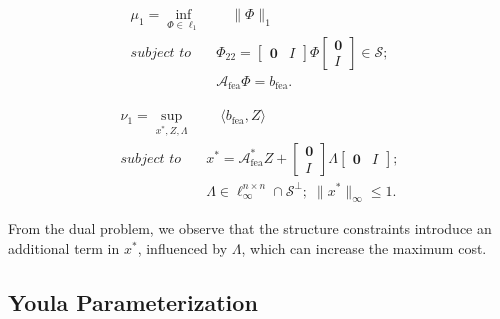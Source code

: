 \begin{opt}\label{Prob::l1min_primal}
\begin{subequations}
\begin{align}
\mu_1 = \underset{\Phi\in\ell_1}{\inf}&\quad  \|\Phi\|_1 \\ 
\textit{subject to} \quad 
& \Phi_{22} = \begin{bmatrix}
    \mathbf{0} &I 
\end{bmatrix}\Phi
\begin{bmatrix}
    \mathbf{0} \\ I
\end{bmatrix} \in\mathcal{S}; \label{eqn::const_strc} \\
& \mathcal{A}_{\mathrm{fea}} \Phi = b_{\mathrm{fea}}. \label{eqn::const_achCL}
\end{align}
\end{subequations}
\end{opt}

\begin{opt}\label{Prob::l1min_dual}
\begin{subequations}
\begin{align} 
    \nu_1 = \underset{x^*, Z, \Lambda}{\sup}& \quad\langle b_{\mathrm{fea}}, Z \rangle \\
\textit{subject to} \quad 
& x^* = \mathcal{A}_{\mathrm{fea}}^* Z + \begin{bmatrix}
    \mathbf{0} \\ I
\end{bmatrix} \Lambda \begin{bmatrix}
    \mathbf{0} & I
\end{bmatrix};\label{eqn::dual_constr} \\
& \Lambda \in \ell_\infty^{n\times n}\cap \mathcal{S}^\perp;\;
\|x^*\|_\infty \leq 1.\ 
\end{align}
\end{subequations}
\end{opt}
From the dual problem, we observe that the structure constraints introduce an additional term in \(x^*\), influenced by \(\Lambda\), which can increase the maximum cost.





 

\subsection{Youla Parameterization}


